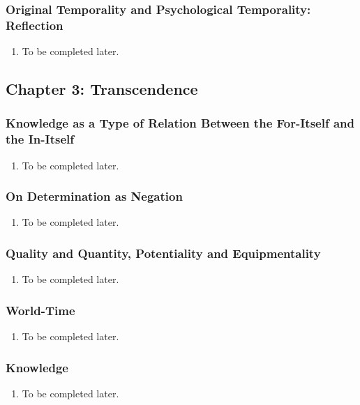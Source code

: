 \subsubsection{Original Temporality and Psychological Temporality: Reflection}

\begin{enumerate}
  \item To be completed later.
\end{enumerate}

\subsection{Chapter 3: Transcendence}

\subsubsection{Knowledge as a Type of Relation Between the For-Itself and the In-Itself}

\begin{enumerate}
  \item To be completed later.
\end{enumerate}

\subsubsection{On Determination as Negation}

\begin{enumerate}
  \item To be completed later.
\end{enumerate}

\subsubsection{Quality and Quantity, Potentiality and Equipmentality}

\begin{enumerate}
  \item To be completed later.
\end{enumerate}

\subsubsection{World-Time}

\begin{enumerate}
  \item To be completed later.
\end{enumerate}

\subsubsection{Knowledge}

\begin{enumerate}
  \item To be completed later.
\end{enumerate}
